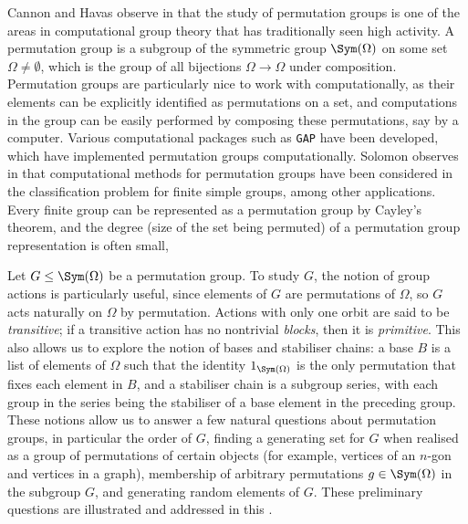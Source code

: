Cannon and Havas observe in \cite{cannon_havas1992} that the study of permutation groups is one of the areas in computational group theory that has traditionally seen high activity. A permutation group is a subgroup of the symmetric group $\Sym(\Omega)$ on some set $\Omega \neq \emptyset$, which is the group of all bijections $\Omega \to \Omega$ under composition. Permutation groups are particularly nice to work with computationally, as their elements can be explicitly identified as permutations on a set, and computations in the group can be easily performed by composing these permutations, say by a computer. Various computational packages such as \texttt{GAP} have been developed, which have implemented permutation groups computationally. Solomon observes in \cite{solomon2001} that computational methods for permutation groups have been considered in the classification problem for finite simple groups, among other applications. Every finite group can be represented as a permutation group by Cayley's theorem, and the degree (size of the set being permuted) of a permutation group representation is often small, 

Let $G \leq \Sym(\Omega)$ be a permutation group. To study $G$, the notion of group actions is particularly useful, since elements of $G$ are permutations of $\Omega$, so $G$ acts naturally on $\Omega$ by permutation. Actions with only one orbit are said to be \textit{transitive}; if a transitive action has no nontrivial \textit{blocks}, then it is \textit{primitive}. This also allows us to explore the notion of bases and stabiliser chains: a base $B$ is a list of elements of $\Omega$ such that the identity $1_{\Sym(\Omega)}$ is the only permutation that fixes each element in $B$, and a stabiliser chain  is a subgroup series, with each group in the series being the stabiliser of a base element in the preceding group.  These notions allow us to answer a few natural questions about permutation groups, in particular  the order of $G$, finding a generating set for $G$ when realised as a group of permutations of certain objects (for example, vertices of an $n$-gon and vertices in a graph),  membership of arbitrary permutations $g \in \Sym(\Omega)$ in the subgroup $G$, and generating random elements of $G$. These preliminary questions are illustrated and addressed in this \thesis{}.

